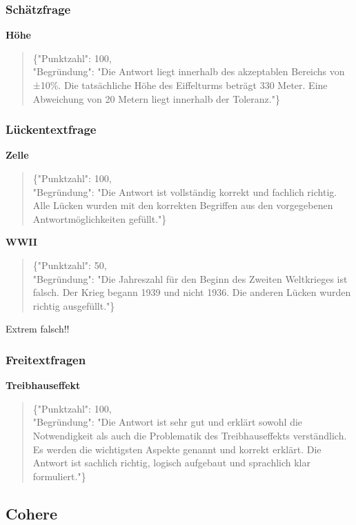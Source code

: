 \documentclass[a4paper,12pt]{article}
\begin{document}
\subsubsection{Schätzfrage}

\textbf{Höhe}
\begin{quote}
\{"Punktzahl": 100,\\
"Begründung": "Die Antwort liegt innerhalb des akzeptablen Bereichs von ±10\%. Die tatsächliche Höhe des Eiffelturms beträgt 330 Meter. Eine Abweichung von 20 Metern liegt innerhalb der Toleranz."\}
\end{quote}

\subsubsection{Lückentextfrage}

\textbf{Zelle}
\begin{quote}
\{"Punktzahl": 100,\\
"Begründung": "Die Antwort ist vollständig korrekt und fachlich richtig. Alle Lücken wurden mit den korrekten Begriffen aus den vorgegebenen Antwortmöglichkeiten gefüllt."\}
\end{quote}

\textbf{WWII}
\begin{quote}
\{"Punktzahl": 50,\\
"Begründung": "Die Jahreszahl für den Beginn des Zweiten Weltkrieges ist falsch. Der Krieg begann 1939 und nicht 1936. Die anderen Lücken wurden richtig ausgefüllt."\}
\end{quote}

Extrem falsch!!

\subsubsection{Freitextfragen}

\textbf{Treibhauseffekt}
\begin{quote}
\{"Punktzahl": 100,\\
"Begründung": "Die Antwort ist sehr gut und erklärt sowohl die Notwendigkeit als auch die Problematik des Treibhauseffekts verständlich. Es werden die wichtigsten Aspekte genannt und korrekt erklärt. Die Antwort ist sachlich richtig, logisch aufgebaut und sprachlich klar formuliert."\}
\end{quote}

\subsection{Cohere}
\end{document}
